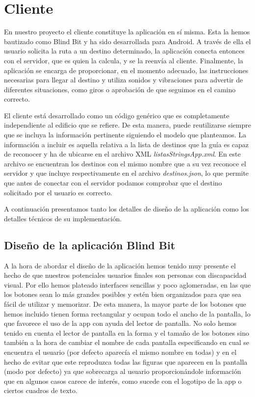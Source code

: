 \section{Cliente}
\label{sec:cliente}
En nuestro proyecto el cliente constituye la aplicación en sí misma. Esta la hemos bautizado como Blind Bit y ha sido desarrollada para Android. A través de ella el usuario solicita la ruta a un destino determinado, la aplicación conecta entonces con el servidor, que es quien la calcula, y se la reenvía al cliente. Finalmente, la aplicación se encarga de proporcionar, en el momento adecuado, las instrucciones necesarias para llegar al destino y utiliza sonidos y vibraciones para advertir de diferentes situaciones, como giros o aprobación de que seguimos en el camino correcto.

El cliente está desarrollado como un código genérico que es completamente independiente al edificio que se refiere. De esta manera, puede reutilizarse siempre que se incluya la información pertinente siguiendo el modelo que planteamos. La información a incluir es aquella relativa a la lista de destinos que la guía es capaz de reconocer y ha de ubicarse en el archivo XML \textit{listasStringsApp.xml}. En este archivo se encuentran los destinos con el mismo nombre que a su vez reconoce el servidor y que incluye respectivamente en el archivo \textit{destinos.json}, lo que permite que antes de conectar con el servidor podamos comprobar que el destino solicitado por el usuario es correcto. 

A continuación presentamos tanto los detalles de diseño de la aplicación como los detalles técnicos de su implementación.

\subsection{Diseño de la aplicación Blind Bit}
\label{sub:diseño}

A la hora de abordar el diseño de la aplicación hemos tenido muy presente el hecho de que nuestros potenciales usuarios finales son personas con discapacidad visual. Por ello hemos plateado interfaces sencillas y poco aglomeradas, en las que los botones sean lo más grandes posibles y estén bien organizados para que sea fácil de utilizar y memorizar. De esta manera, la mayor parte de los botones que hemos incluido tienen forma rectangular y ocupan todo el ancho de la pantalla, lo que favorece el uso de la app con ayuda del lector de pantalla. No solo hemos tenido en cuenta el lector de pantalla en la forma y el tamaño de los botones sino también a la hora de cambiar el nombre de cada pantalla especificando en cual se encuentra el usuario (por defecto aparecía el mismo nombre en todas) y en el hecho de evitar que este reproduzca todas las figuras que aparecen en la pantalla (modo por defecto) ya que sobrecarga al usuario proporcionándole información que en algunos casos carece de interés, como sucede con el logotipo de la app o ciertos cuadros de texto.

